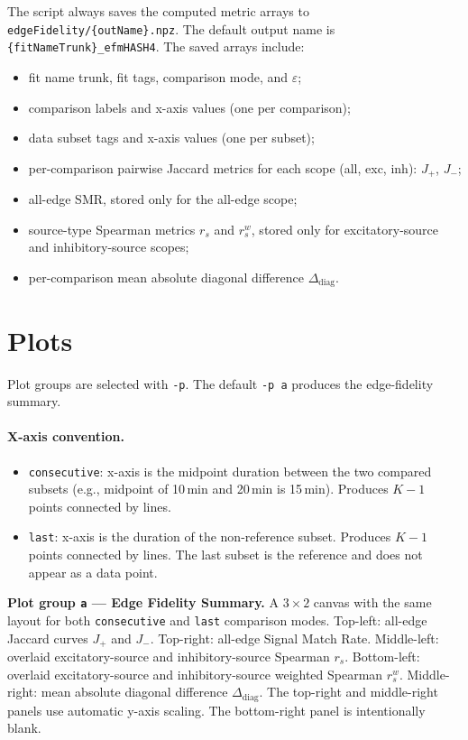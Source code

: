 \documentclass[11pt]{article}
\begin{document}
The script always saves the computed metric arrays to \texttt{edgeFidelity/\{outName\}.npz}. The default output name is \texttt{\{fitNameTrunk\}\_efmHASH4}. The saved arrays include:
\begin{itemize}
    \item fit name trunk, fit tags, comparison mode, and $\varepsilon$;
    \item comparison labels and x-axis values (one per comparison);
    \item data subset tags and x-axis values (one per subset);
    \item per-comparison pairwise Jaccard metrics for each scope (all, exc, inh): $J_+$, $J_-$;
    \item all-edge SMR, stored only for the all-edge scope;
    \item source-type Spearman metrics $r_s$ and $r_s^w$, stored only for excitatory-source and inhibitory-source scopes;
    \item per-comparison mean absolute diagonal difference $\Delta_{\text{diag}}$.
\end{itemize}

\section{Plots}
\label{sec:plots}

Plot groups are selected with \texttt{-p}. The default \texttt{-p a} produces the edge-fidelity summary.

\paragraph{X-axis convention.}
\begin{itemize}
    \item \texttt{consecutive}: x-axis is the midpoint duration between the two compared subsets (e.g., midpoint of 10\,min and 20\,min is 15\,min). Produces $K-1$ points connected by lines.
    \item \texttt{last}: x-axis is the duration of the non-reference subset. Produces $K-1$ points connected by lines. The last subset is the reference and does not appear as a data point.
\end{itemize}

\bigskip
\noindent\textbf{Plot group \texttt{a} --- Edge Fidelity Summary.}
A $3 \times 2$ canvas with the same layout for both \texttt{consecutive} and \texttt{last} comparison modes. Top-left: all-edge Jaccard curves $J_+$ and $J_-$. Top-right: all-edge Signal Match Rate. Middle-left: overlaid excitatory-source and inhibitory-source Spearman $r_s$. Bottom-left: overlaid excitatory-source and inhibitory-source weighted Spearman $r_s^w$. Middle-right: mean absolute diagonal difference $\Delta_{\text{diag}}$. The top-right and middle-right panels use automatic y-axis scaling. The bottom-right panel is intentionally blank.
\end{document}
